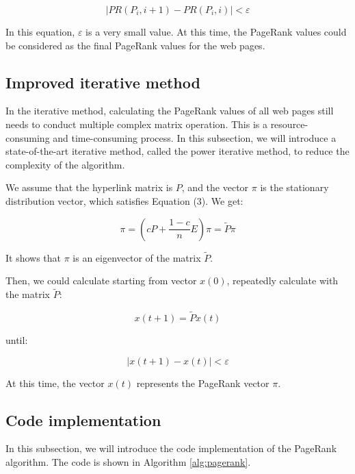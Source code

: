 \documentclass[lettersize,journal,12pt,conference]{IEEEtran}
\begin{document}
\begin{equation}
	\label{eq:8}
	|PR(P_i, i+1) - PR(P_i, i)| < \varepsilon
\end{equation}
 
In this equation, \(\varepsilon\) is a very small value. At this time, the PageRank values could be considered as the final PageRank values for the web pages.

\subsection{Improved iterative method}

In the iterative method, calculating the PageRank values of all web pages still needs to conduct multiple complex matrix operation. This is a resource-consuming and time-consuming process. In this subsection, we will introduce a state-of-the-art iterative method, called the power iterative method, to reduce the complexity of the algorithm.

We assume that the hyperlink matrix is $P$, and the vector $\pi$ is the stationary distribution vector, which satisfies Equation (3). We get: 

\begin{equation}
	\label{eq:9}
	\pi = (cP + \frac{1 - c}{n}E)\pi = \widetilde{P}\pi
\end{equation}

It shows that $\pi$ is an eigenvector of the matrix $\widetilde{P}$.

Then, we could calculate starting from vector $x(0)$, repeatedly calculate with the matrix $\widetilde{P}$: 

\begin{equation}
	\label{eq:10}
	x(t+1) = \widetilde{P}x(t)
\end{equation}

until:

\begin{equation}
	\label{eq:11}
	|x(t+1) - x(t)| < \varepsilon
\end{equation}

At this time, the vector $x(t)$ represents the PageRank vector $\pi$.

\subsection{Code implementation}

In this subsection, we will introduce the code implementation of the PageRank algorithm. The code is shown in Algorithm \ref{alg:pagerank}.
\end{document}

